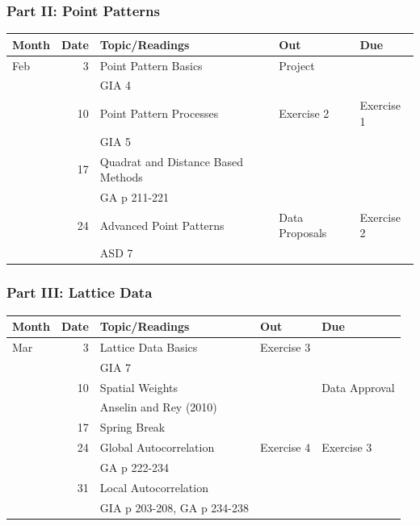 \documentclass[nototal,handout]{beamer}
\begin{document}
\begin{frame}
	\frametitle{Part II: Point Patterns}
  \begin{center}
    \begin{footnotesize}
\begin{tabular}{|lr|l|l|l|}
\hline
Month & \multicolumn{1}{l|}{Date} & Topic/Readings & Out & Due \\ \hline
Feb & 3 & Point Pattern Basics &Project &  \\ 
    &    & GIA 4 & &\\
 & 10 & Point Pattern Processes & Exercise 2 & Exercise 1 \\ 
    &    & GIA 5 & & \\
     & 17 & Quadrat and Distance Based Methods &  & \\ 
    &    & GA p 211-221 & &\\
 & 24 & Advanced Point Patterns &Data Proposals  & Exercise 2  \\ 
    &    & ASD 7 & &\\
 \hline
\end{tabular}
    \end{footnotesize}
  \end{center}
 \end{frame} 
 

\begin{frame}
	\frametitle{Part III: Lattice Data}
  \begin{center}
    \begin{footnotesize}
\begin{tabular}{|lr|l|l|l|}
\hline
Month & \multicolumn{1}{l|}{Date} & Topic/Readings & Out & Due \\ \hline
Mar & 3 & Lattice Data Basics & Exercise 3 & \\ 
    &    & GIA 7 & &\\
 & 10 & Spatial Weights &  &Data Approval   \\ 
    &    & Anselin and Rey (2010) & &\\
 & 17 & Spring Break &  &  \\ 
 & 24 & Global Autocorrelation & Exercise 4 & Exercise 3 \\ 
    &    &  GA p 222-234 & &\\
 & 31 & Local Autocorrelation &  &  \\ 
    &    & GIA p 203-208, GA p 234-238& &\\
 \hline
\end{tabular}
    \end{footnotesize}
  \end{center}
 \end{frame} 
\end{document}
